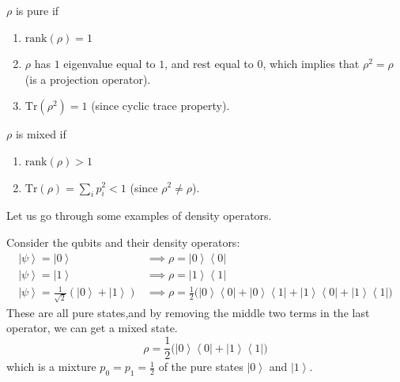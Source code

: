 \documentclass{article}
\newcommand{\ket}[1]{\ensuremath{\left|#1\right\rangle}}
\newcommand{\bra}[1]{\ensuremath{\left\langle#1\right|}}
\begin{document}
  \begin{theorem}
    $\rho$ is pure if 
    \begin{enumerate} 
      \item $\mathrm{rank}(\rho) = 1$ 
      \item $\rho$ has $1$ eigenvalue equal to $1$, and rest equal to $0$, which implies that $\rho^2 = \rho$ (is a projection operator).
      \item $\mathrm{Tr}(\rho^2) = 1$ (since cyclic trace property). 
    \end{enumerate}

    $\rho$ is mixed if 
    \begin{enumerate} 
      \item $\mathrm{rank}(\rho) > 1$
      \item $\mathrm{Tr}(\rho) = \sum_i p_i^2 < 1$ (since $\rho^2 \neq \rho$).
    \end{enumerate}
  \end{theorem}
  
  Let us go through some examples of density operators. 

  \begin{example}
    Consider the qubits and their density operators: 
    \begin{align} 
      \ket{\psi} = \ket{0} & \implies \rho = \ket{0} \bra{0} \\
      \ket{\psi} = \ket{1} & \implies \rho = \ket{1} \bra{1} \\
      \ket{\psi} = \frac{1}{\sqrt{2}} ( \ket{0} + \ket{1}) & \implies \rho = \frac{1}{2} \big( \ket{0} \bra{0} + \ket{0} \bra{1} + \ket{1} \bra{0} + \ket{1} \bra{1} \big) 
    \end{align}
    These are all pure states,and by removing the middle two terms in the last operator, we can get a mixed state. 
    \begin{equation} 
      \rho = \frac{1}{2} \big( \ket{0} \bra{0} + \ket{1} \bra{1} \big) 
    \end{equation}
    which is a mixture $p_0 = p_1 = \frac{1}{2}$ of the pure states $\ket{0}$ and $\ket{1}$. 

  \end{example}
\end{document}
